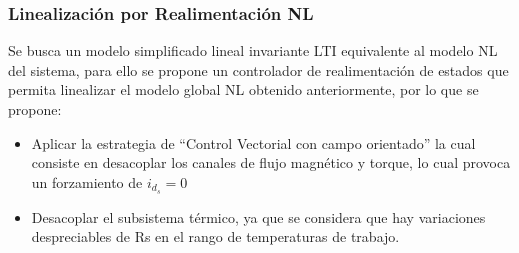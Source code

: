 \documentclass{article}
\begin{document}

\subsubsection*{Linealización por Realimentación NL}

Se busca un modelo simplificado lineal invariante LTI equivalente al modelo NL del sistema, 
para ello se propone un controlador de realimentación de estados que permita linealizar el 
modelo global NL obtenido anteriormente, por lo que se propone:

\begin{itemize}
    \item Aplicar la estrategia de “Control Vectorial con campo orientado” la cual 
    consiste en desacoplar los canales de flujo magnético y torque, lo cual provoca
    un forzamiento de $i_{d_{s}}=0$ 
    \item Desacoplar el subsistema térmico, ya que se considera que hay variaciones despreciables 
    de Rs en el rango de temperaturas de trabajo.
\end{itemize}
\end{document}
